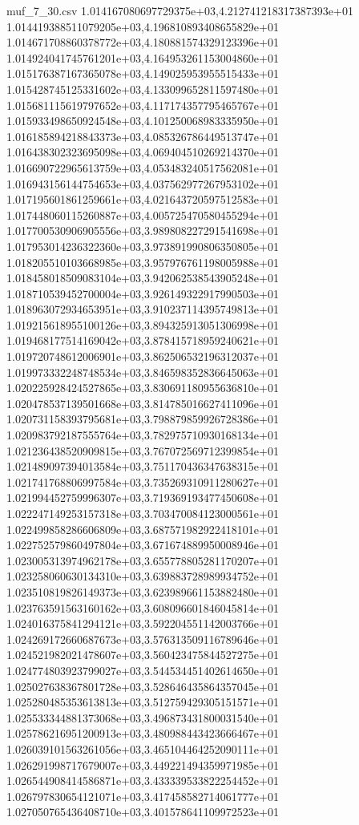 \begin{filecontents*}{muf_7_30.csv}
1.014167080697729375e+03,4.212741218317387393e+01
1.014419388511079205e+03,4.196810893408655829e+01
1.014671708860378772e+03,4.180881574329123396e+01
1.014924041745761201e+03,4.164953261153004860e+01
1.015176387167365078e+03,4.149025953955515433e+01
1.015428745125331602e+03,4.133099652811597480e+01
1.015681115619797652e+03,4.117174357795465767e+01
1.015933498650924548e+03,4.101250068983335950e+01
1.016185894218843373e+03,4.085326786449513747e+01
1.016438302323695098e+03,4.069404510269214370e+01
1.016690722965613759e+03,4.053483240517562081e+01
1.016943156144754653e+03,4.037562977267953102e+01
1.017195601861259661e+03,4.021643720597512583e+01
1.017448060115260887e+03,4.005725470580455294e+01
1.017700530906905556e+03,3.989808227291541698e+01
1.017953014236322360e+03,3.973891990806350805e+01
1.018205510103668985e+03,3.957976761198005988e+01
1.018458018509083104e+03,3.942062538543905248e+01
1.018710539452700004e+03,3.926149322917990503e+01
1.018963072934653951e+03,3.910237114395749813e+01
1.019215618955100126e+03,3.894325913051306998e+01
1.019468177514169042e+03,3.878415718959240621e+01
1.019720748612006901e+03,3.862506532196312037e+01
1.019973332248748534e+03,3.846598352836645063e+01
1.020225928424527865e+03,3.830691180955636810e+01
1.020478537139501668e+03,3.814785016627411096e+01
1.020731158393795681e+03,3.798879859926728386e+01
1.020983792187555764e+03,3.782975710930168134e+01
1.021236438520909815e+03,3.767072569712399854e+01
1.021489097394013584e+03,3.751170436347638315e+01
1.021741768806997584e+03,3.735269310911280627e+01
1.021994452759996307e+03,3.719369193477450608e+01
1.022247149253157318e+03,3.703470084123000561e+01
1.022499858286606809e+03,3.687571982922418101e+01
1.022752579860497804e+03,3.671674889950008946e+01
1.023005313974962178e+03,3.655778805281170207e+01
1.023258060630134310e+03,3.639883728989934752e+01
1.023510819826149373e+03,3.623989661153882480e+01
1.023763591563160162e+03,3.608096601846045814e+01
1.024016375841294121e+03,3.592204551142003766e+01
1.024269172660687673e+03,3.576313509116789646e+01
1.024521982021478607e+03,3.560423475844527275e+01
1.024774803923799027e+03,3.544534451402614650e+01
1.025027638367801728e+03,3.528646435864357045e+01
1.025280485353613813e+03,3.512759429305151571e+01
1.025533344881373068e+03,3.496873431800031540e+01
1.025786216951200913e+03,3.480988443423666467e+01
1.026039101563261056e+03,3.465104464252090111e+01
1.026291998717679007e+03,3.449221494359971985e+01
1.026544908414586871e+03,3.433339533822254452e+01
1.026797830654121071e+03,3.417458582714061777e+01
1.027050765436408710e+03,3.401578641109972523e+01

\end{filecontents*}
